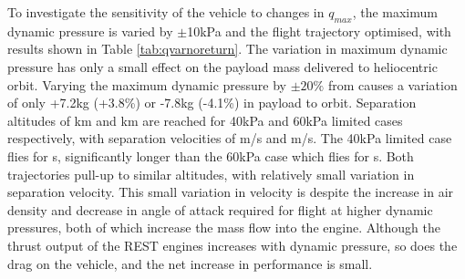To investigate the sensitivity of the vehicle to changes in $q_{max}$, the maximum dynamic pressure is varied by $\pm$10kPa and the flight trajectory optimised, with results shown in Table \ref{tab:qvarnoreturn}.
The variation in maximum dynamic pressure has only a small effect on the payload mass delivered to heliocentric orbit.  Varying the maximum dynamic pressure by $\pm20\%$ from causes a variation of only  +7.2kg (+3.8\%) or -7.8kg (-4.1\%) in payload to orbit.  
Separation altitudes of \secondthirdSeparationAltqFortyNoReturn km and \secondthirdSeparationAltqSixtyNoReturn km are reached for 40kPa and 60kPa limited cases respectively, with separation velocities of \secondthirdSeparationvqFortyNoReturn m/s and \secondthirdSeparationvqSixtyNoReturn m/s. The 40kPa limited case flies for \secondFlightTimeqFortyNoReturn s, significantly longer than the 60kPa case which flies for \secondFlightTimeqSixtyNoReturn s.
Both trajectories pull-up to similar altitudes, with relatively small variation in separation velocity.
This small variation in velocity is despite the increase in air density and decrease in angle of attack required for flight at higher dynamic pressures, both of which increase the mass flow into the engine. Although the thrust output of the REST engines increases with dynamic pressure, so does the drag on the vehicle, and the net increase in performance is small. 


